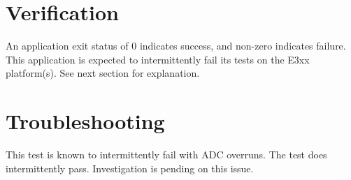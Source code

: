 \section{Verification}
An application exit status of 0 indicates success, and non-zero indicates failure.
This application is expected to intermittently fail its tests on the E3xx platform(s). See next section for explanation.

\section{Troubleshooting} This test is known to intermittently fail with ADC overruns. The test does intermittently pass. Investigation is pending on this issue.


